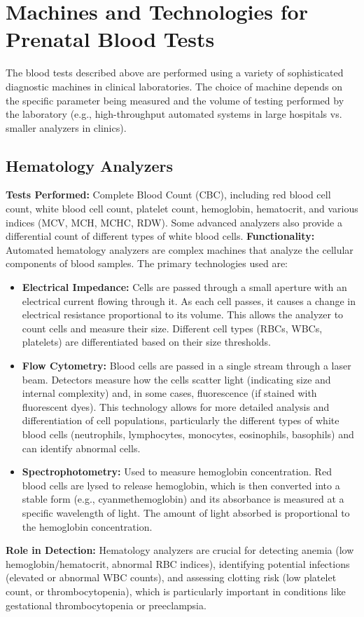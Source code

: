\documentclass{article}
\begin{document}
\section{Machines and Technologies for Prenatal Blood Tests}

The blood tests described above are performed using a variety of sophisticated diagnostic machines in clinical laboratories. The choice of machine depends on the specific parameter being measured and the volume of testing performed by the laboratory (e.g., high-throughput automated systems in large hospitals vs. smaller analyzers in clinics).

\subsection{Hematology Analyzers}
\textbf{Tests Performed:} Complete Blood Count (CBC), including red blood cell count, white blood cell count, platelet count, hemoglobin, hematocrit, and various indices (MCV, MCH, MCHC, RDW). Some advanced analyzers also provide a differential count of different types of white blood cells.
\textbf{Functionality:} Automated hematology analyzers are complex machines that analyze the cellular components of blood samples. The primary technologies used are:
\begin{itemize}
    \item \textbf{Electrical Impedance:} Cells are passed through a small aperture with an electrical current flowing through it. As each cell passes, it causes a change in electrical resistance proportional to its volume. This allows the analyzer to count cells and measure their size. Different cell types (RBCs, WBCs, platelets) are differentiated based on their size thresholds.
    \item \textbf{Flow Cytometry:} Blood cells are passed in a single stream through a laser beam. Detectors measure how the cells scatter light (indicating size and internal complexity) and, in some cases, fluorescence (if stained with fluorescent dyes). This technology allows for more detailed analysis and differentiation of cell populations, particularly the different types of white blood cells (neutrophils, lymphocytes, monocytes, eosinophils, basophils) and can identify abnormal cells.
    \item \textbf{Spectrophotometry:} Used to measure hemoglobin concentration. Red blood cells are lysed to release hemoglobin, which is then converted into a stable form (e.g., cyanmethemoglobin) and its absorbance is measured at a specific wavelength of light. The amount of light absorbed is proportional to the hemoglobin concentration.
\end{itemize}
\textbf{Role in Detection:} Hematology analyzers are crucial for detecting anemia (low hemoglobin/hematocrit, abnormal RBC indices), identifying potential infections (elevated or abnormal WBC counts), and assessing clotting risk (low platelet count, or thrombocytopenia), which is particularly important in conditions like gestational thrombocytopenia or preeclampsia.
\end{document}
